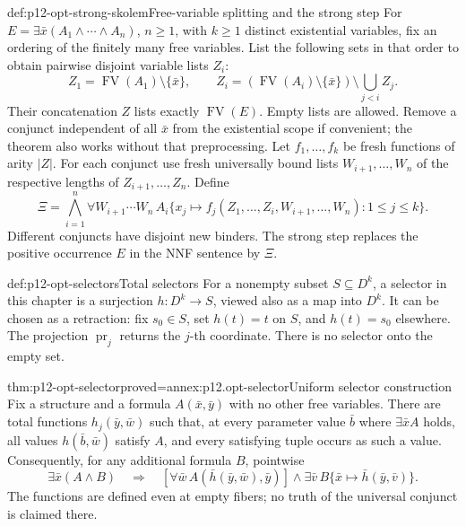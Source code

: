 \begin{hbdefinition}{def:p12-opt-strong-skolem}{Free-variable splitting and the strong step}
For \(E=\exists\bar x(A_1\land\cdots\land A_n)\), \(n\ge1\),
with \(k\ge1\) distinct existential variables, fix an ordering
of the finitely many free variables. List the following sets in
that order to obtain pairwise disjoint variable lists \(Z_i\):
\[
 Z_1=\operatorname{FV}(A_1)\setminus\{\bar x\},\qquad
 Z_i=(\operatorname{FV}(A_i)\setminus\{\bar x\})
                 \setminus\bigcup_{j<i}Z_j.
\]
Their concatenation \(Z\) lists exactly \(\operatorname{FV}(E)\).
Empty lists are allowed. Remove a conjunct independent of all
\(\bar x\) from the existential scope if convenient; the theorem
also works without that preprocessing.
Let \(f_1,\ldots,f_k\) be fresh functions of arity \(|Z|\).
For each conjunct use fresh universally bound lists
\(W_{i+1},\ldots,W_n\) of the respective lengths of \(Z_{i+1},\ldots,Z_n\).
Define
\[
 \Xi=\bigwedge_{i=1}^n
 \forall W_{i+1}\cdots W_n\,
 A_i\{x_j\mapsto
 f_j(Z_1,\ldots,Z_i,W_{i+1},\ldots,W_n):1\le j\le k\}.
\]
Different conjuncts have disjoint new binders. The strong step replaces
the positive occurrence \(E\) in the NNF sentence by \(\Xi\).
\end{hbdefinition}

\begin{hbdefinition}{def:p12-opt-selectors}{Total selectors}
For a nonempty subset \(S\subseteq D^k\), a selector in this
chapter is a surjection \(h:D^k\to S\), viewed also as a map into
\(D^k\). It can be chosen as a retraction:
fix \(s_0\in S\), set \(h(t)=t\) on \(S\), and \(h(t)=s_0\)
elsewhere. The projection \(\operatorname{pr}_j\) returns the \(j\)-th
coordinate. There is no selector onto the empty set.
\end{hbdefinition}

\begin{hbtheorem}{thm:p12-opt-selector}{proved=annex:p12.opt-selector}{Uniform selector construction}
Fix a structure and a formula \(A(\bar x,\bar y)\) with no other
free variables. There are total functions \(h_j(\bar y,\bar w)\)
such that, at every parameter value \(\bar b\) where
\(\exists\bar xA\) holds, all values \(h(\bar b,\bar w)\) satisfy
\(A\), and every satisfying tuple occurs as such a value.
Consequently, for any additional formula \(B\), pointwise
\[
 \exists\bar x(A\land B)\quad\Longrightarrow\quad
 [\forall\bar w\,A(\bar h(\bar y,\bar w),\bar y)]
 \land\exists\bar v\,B\{\bar x\mapsto\bar h(\bar y,\bar v)\}.
\]
The functions are defined even at empty fibers; no truth of the
universal conjunct is claimed there.
\end{hbtheorem}

